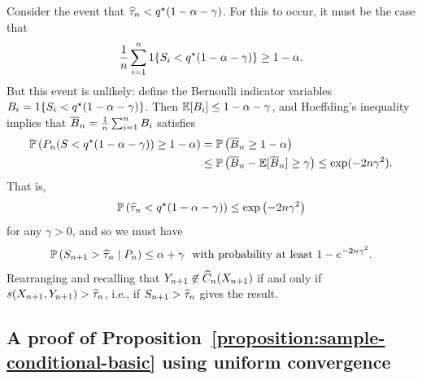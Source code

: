 \documentclass{article}
\newcommand{\scorefunc}{s}
\newcommand{\scoreval}{\scorefunc}
\newcommand{\scorerv}{S}
\begin{document}
Consider the event that $\widehat{\tau}_n < q^\star(1 - \alpha - \gamma)$.
%
For this to occur, it must be the case that
\begin{equation}
  \label{eqn:quantile-too-small}
  \frac{1}{n} \sum_{i = 1}^n \indic{\scorerv_i < q\opt(1 - \alpha - \gamma)}
  \ge 1 - \alpha.
\end{equation}
But this event is unlikely: define the Bernoulli indicator variables $B_i =
\indic{\scorerv_i < q\opt(1 - \alpha - \gamma)}$.
%
Then $\mathbb{E}[B_i] \le 1 -
\alpha - \gamma$, and Hoeffding's inequality implies
that $\overline{B}_n = \frac{1}{n} \sum_{i = 1}^n B_i$ satisfies
\begin{align*}
  \P\left(P_n(\scorerv < q\opt(1 - \alpha - \gamma)) \ge 1 - \alpha
  \right)
  & = \P\left(\wb{B}_n \ge 1 - \alpha\right) \\
  & \le \P\left(\wb{B}_n - \E[\wb{B}_n] \ge \gamma\right)
  \le \exp(-2 n \gamma^2).
\end{align*}
That is,
\begin{align*}
  \mathbb{P}\left(\widehat{\tau}_n < q^\star(1 - \alpha - \gamma)\right)
  \le \exp\left(-2n\gamma^2 \right)
\end{align*}
for any $\gamma > 0$, and so we must have
\begin{equation*}
  \P\left(\scorerv_{n + 1} > \what{\tau}_n \mid P_n \right) \le \alpha + \gamma
  ~~ \mbox{with~probability~at~least}~
  1 - e^{-2n\gamma^2}.
\end{equation*}
Rearranging and recalling that $Y_{n + 1} \not \in \widehat{C}_n(X_{n + 1})$ if
and only if $\scoreval(X_{n+1}, Y_{n + 1}) > \what{\tau}_n$, i.e., if
$\scorerv_{n + 1} > \what{\tau}_n$ gives the result.

\subsection{A proof of Proposition~\ref{proposition:sample-conditional-basic}
  using uniform convergence}
\label{sec:baby-uniform-convergence}
\end{document}
